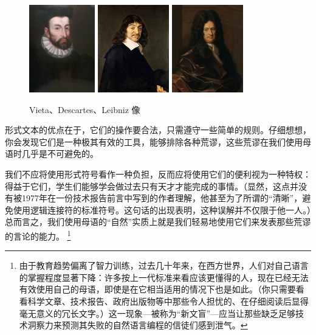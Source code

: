 \documentclass[a4paper,12pt]{article}
\begin{document}
\begin{figure}[ht]
    \centering
    \includegraphics[height=1.5in]{images/Francois_Viete.jpeg}
    \includegraphics[height=1.5in]{images/Descartes.jpeg}
    \includegraphics[height=1.5in]{images/Leibniz.jpeg}
    \caption{Vieta、Descartes、Leibniz 像}
\end{figure}

形式文本的优点在于，它们的操作要合法，只需遵守一些简单的规则。仔细想想，你会发现它们是一种极其有效的工具，能够排除各种荒谬，这些荒谬在我们使用母语时几乎是不可避免的。

我们不应将使用形式符号看作一种负担，反而应将使用它们的便利视为一种特权：得益于它们，学生们能够学会做过去只有天才才能完成的事情。（显然，这点并没有被1977年在一份技术报告前言中写到的作者理解，他甚至为了所谓的“清晰”，避免使用逻辑连接符的标准符号。这句话的出现表明，这种误解并不仅限于他一人。）总而言之，我们使用母语的“自然”实质上就是我们轻易地使用它们来发表那些荒谬的言论的能力。
\footnote{由于教育趋势偏离了智力训练，过去几十年来，在西方世界，人们对自己语言的掌握程度显著下降：许多按上一代标准来看应该更懂得的人，现在已经无法有效使用自己的母语，即使是在它相当适用的情况下也是如此。（你只需要看看科学文章、技术报告、政府出版物等中那些令人担忧的、在仔细阅读后显得毫无意义的冗长文字。）这一现象—被称为“新文盲”—应当让那些缺乏足够技术洞察力来预测其失败的自然语言编程的信徒们感到泄气。}
\end{document}
